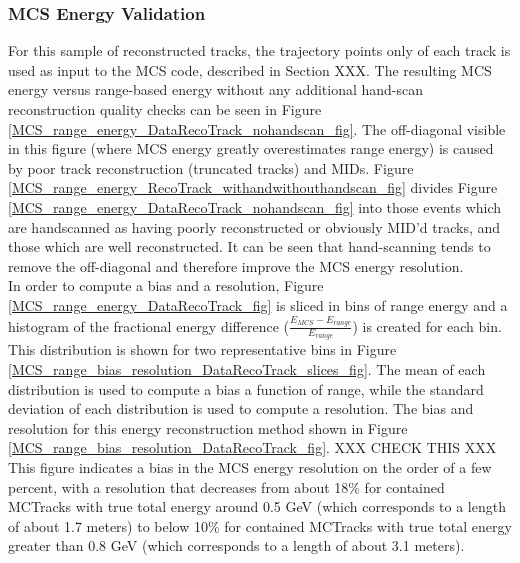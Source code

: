 \subsubsection{MCS Energy Validation}\label{MCS_Energy_Validation_DataRecoTrack_section}
For this sample of reconstructed tracks, the trajectory points only of each track is used as input to the MCS code, described in Section XXX. The resulting MCS energy versus range-based energy without any additional hand-scan reconstruction quality checks can be seen in Figure \ref{MCS_range_energy_DataRecoTrack_nohandscan_fig}. The off-diagonal visible in this figure (where MCS energy greatly overestimates range energy) is caused by poor track reconstruction (truncated tracks) and MIDs. Figure \ref{MCS_range_energy_RecoTrack_withandwithouthandscan_fig} divides Figure \ref{MCS_range_energy_DataRecoTrack_nohandscan_fig} into those events which are handscanned as having poorly reconstructed or obviously MID'd tracks, and those which are well reconstructed. It can be seen that hand-scanning tends to remove the off-diagonal and therefore improve the MCS energy resolution.\\

In order to compute a bias and a resolution, Figure \ref{MCS_range_energy_DataRecoTrack_fig} is sliced in bins of range energy and a histogram of the fractional energy difference ($\frac{E_{MCS} - E_{range}}{E_{range}}$) is created for each bin. This distribution is shown for two representative bins in Figure \ref{MCS_range_bias_resolution_DataRecoTrack_slices_fig}. The mean of each distribution is used to compute a bias a function of range, while the standard deviation of each distribution is used to compute a resolution. The bias and resolution for this energy reconstruction method shown in Figure \ref{MCS_range_bias_resolution_DataRecoTrack_fig}. XXX CHECK THIS XXX This figure indicates a bias in the MCS energy resolution on the order of a few percent, with a resolution that decreases from about 18\% for contained {\sc MCTracks} with true total energy around 0.5 GeV (which corresponds to a length of about 1.7 meters) to below 10\% for contained {\sc MCTracks} with true total energy greater than 0.8 GeV (which corresponds to a length of about 3.1 meters).


